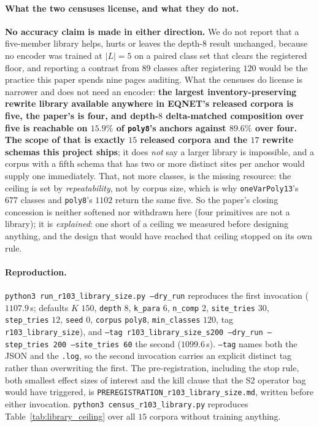 \paragraph{What the two censuses license, and what they do not.} \textbf{No accuracy claim is made in either direction.} We do not report that a five-member library helps, hurts or leaves the depth-$8$ result unchanged, because no encoder was trained at $|L|{=}5$ on a paired class set that clears the registered floor, and reporting a contrast from $89$ classes after registering $120$ would be the practice this paper spends nine pages auditing. What the censuses do license is narrower and does not need an encoder: \textbf{the largest inventory-preserving rewrite library available anywhere in EQNET's released corpora is five, the paper's is four, and depth-$8$ delta-matched composition over five is reachable on $15.9\%$ of \texttt{poly8}'s anchors against $89.6\%$ over four.} \textbf{The scope of that is exactly $15$ released corpora and the $17$ rewrite schemas this project ships}; it does \emph{not} say a larger library is impossible, and a corpus with a fifth schema that has two or more distinct sites per anchor would supply one immediately. That, not more classes, is the missing resource: the ceiling is set by \emph{repeatability}, not by corpus size, which is why \texttt{oneVarPoly13}'s $677$ classes and \texttt{poly8}'s $1102$ return the same five. So the paper's closing concession is neither softened nor withdrawn here (four primitives are not a library); it is \emph{explained}: one short of a ceiling we measured before designing anything, and the design that would have reached that ceiling stopped on its own rule.

\paragraph{Reproduction.} \texttt{python3 run\_r103\_library\_size.py --dry\_run} reproduces the first invocation ($1107.9$\,s; defaults $K$ $150$, \texttt{depth} $8$, \texttt{k\_para} $6$, \texttt{n\_comp} $2$, \texttt{site\_tries} $30$, \texttt{step\_tries} $12$, \texttt{seed} $0$, \texttt{corpus} \texttt{poly8}, \texttt{min\_classes} $120$, tag \texttt{r103\_library\_size}), and \texttt{--tag r103\_library\_size\_s200 --dry\_run --step\_tries 200 --site\_tries 60} the second ($1099.6$\,s). \texttt{--tag} names both the JSON and the \texttt{.log}, so the second invocation carries an explicit distinct tag rather than overwriting the first. The pre-registration, including the stop rule, both smallest effect sizes of interest and the kill clause that the S2 operator bag would have triggered, is \texttt{PREREGISTRATION\_r103\_library\_size.md}, written before either invocation. \texttt{python3 census\_r103\_library.py} reproduces Table~\ref{tab:library_ceiling} over all $15$ corpora without training anything.
